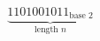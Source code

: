 \documentclass[preview]{standalone}
\begin{document}
\begin{align*}
\underbrace{1101001011_{\text{base } 2}}_{\text{length } n}
\end{align*}
\end{document}
